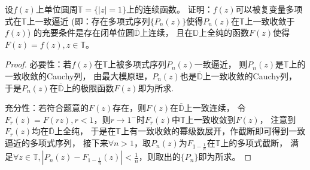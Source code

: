 \begin{11}
    设$f(z)$上单位圆周$\mathbb{T}=\{|z|=1\}$上的连续函数。
    证明：$f(z)$可以被复变量多项式在$\mathbb{T}$上一致逼近
    (即：存在多项式序列$\{P_n(z)\}$使得$P_n(z)$在$\mathbb{T}$上一致收敛于$f(z)$)
    的充要条件是存在闭单位圆$\overline{\mathbb{D}}$上连续，
    且在$\mathbb{D}$上全纯的函数$F(z)$使得$F(z)=f(z),z\in\mathbb{T}$。
\end{11}
\begin{proof}
    必要性：若$f(z)$在$\mathbb{T}$上被多项式序列${P_n(z)}$一致逼近，
    则${P_n(z)}$是$\mathbb{T}$上的一致收敛的Cauchy列，
    由最大模原理，${P_n(z)}$也是$\overline{\mathbb{D}}$上一致收敛的Cauchy列，
    于是${P_n(z)}$在$\overline{\mathbb{D}}$上的极限函数$F(z)$即为所求.

    充分性：若符合题意的$F(z)$存在，则$F(z)$在$\overline{\mathbb{D}}$上一致连续，
    令$F_r(z)=F(rz),r<1$，则$r\rightarrow1^-$时$F_r(z)$中$\mathbb{T}$上一致收敛到$F(z)$，
    注意到$F_r(z)$均在$\overline{\mathbb{D}}$上全纯，
    于是在$\mathbb{T}$上有一致收敛的幂级数展开，作截断即可得到一致逼近的多项式序列，
    接下来$\forall n>1$，取$P_n(z)$为$F_{1-\frac{1}{n}}$在$\mathbb{T}$上的多项式截断，
    满足$\forall z\in\mathbb{T},|P_n(z)-F_{1-\frac{1}{n}}(z)|<\frac{1}{n}$，则取出的$\{P_n\}$即为所求。
\end{proof}

